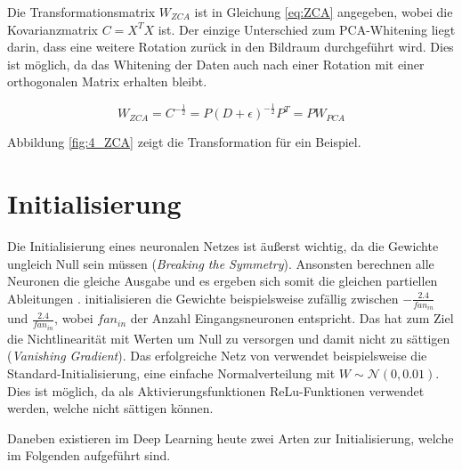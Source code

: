 Die Transformationsmatrix $W_{ZCA}$ ist in Gleichung \ref{eq:ZCA} angegeben, wobei die Kovarianzmatrix $C = X^TX$ ist. Der einzige Unterschied zum PCA-Whitening liegt darin, dass eine weitere Rotation zurück in den Bildraum durchgeführt wird. Dies ist möglich, da das Whitening der Daten auch nach einer Rotation mit einer orthogonalen Matrix erhalten bleibt.

\begin{equation}
\label{eq:ZCA} 
W_{ZCA} = C^{-\frac{1}{2}} = P(D+\epsilon)^{-\frac{1}{2}}P^T = PW_{PCA}
\end{equation}

Abbildung \ref{fig:4_ZCA} zeigt die Transformation für ein Beispiel.


\section{Initialisierung}
Die Initialisierung eines neuronalen Netzes ist äußerst wichtig, da die Gewichte ungleich Null sein müssen (\textit{Breaking the Symmetry}). Ansonsten berechnen alle Neuronen die gleiche Ausgabe und es ergeben sich somit die gleichen partiellen Ableitungen \cite[vgl.][S. 201]{Rojas1996}.
\cite{LeCun1989} initialisieren die Gewichte beispielsweise zufällig zwischen $-\frac{2.4}{fan_{in}}$ und $\frac{2.4}{fan_{in}}$, wobei $fan_{in}$ der Anzahl Eingangsneuronen entspricht. Das hat zum Ziel die Nichtlinearität mit Werten um Null zu versorgen und damit nicht zu sättigen (\textit{Vanishing Gradient}).
Das erfolgreiche Netz von \cite{Krizhevsky2012} verwendet beispielsweise die Standard-Initialisierung, eine einfache Normalverteilung mit $W \sim \mathcal{N} (0,0.01)$. Dies ist möglich, da als Aktivierungsfunktionen ReLu-Funktionen verwendet werden, welche nicht sättigen können. 

Daneben existieren im Deep Learning heute zwei Arten zur Initialisierung, welche im Folgenden aufgeführt sind. 

